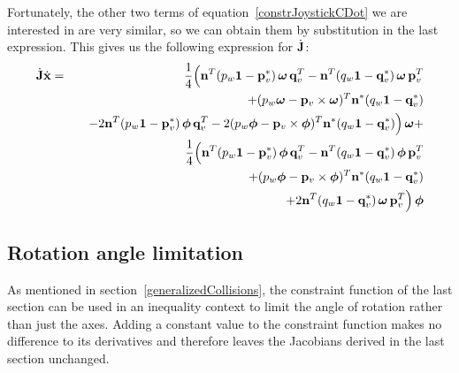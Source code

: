 Fortunately, the other two terms of equation~\ref{constrJoystickCDot} we are interested in are
very similar, so we can obtain them by substitution in the last expression. This gives us the
following expression for $\dot{\m{J}}$:
\begin{eqnarray}
\dot{\m{J}}\dot{\ve{x}} &=&
    \frac{1}{4}\Big( \ve{n}^T (p_w\m{1} - \dual{\ve{p}_v})\, \ve{\omega}\,\ve{q}_v^T
    -\ve{n}^T (q_w\m{1} - \dual{\ve{q}_v})\, \ve{\omega}\,\ve{p}_v^T \nonumber\\*&&\quad
    +(p_w\ve{\omega} - \ve{p}_v\times\ve{\omega})^T \dual{\ve{n}} (q_w\m{1} - \dual{\ve{q}_v})
    \nonumber\\*&&\quad
    -2\ve{n}^T (p_w\m{1} - \dual{\ve{p}_v})\, \ve{\phi}\,\ve{q}_v^T
    -2(p_w\ve{\phi} - \ve{p}_v\times\ve{\phi})^T \dual{\ve{n}} (q_w\m{1} - \dual{\ve{q}_v})
    \Big)\, \ve{\omega} + \nonumber\\*&&
    \frac{1}{4}\Big( \ve{n}^T (p_w\m{1} - \dual{\ve{p}_v})\, \ve{\phi}\,\ve{q}_v^T
    -\ve{n}^T (q_w\m{1} - \dual{\ve{q}_v})\, \ve{\phi}\,\ve{p}_v^T \nonumber\\*&&\quad
    +(p_w\ve{\phi} - \ve{p}_v\times\ve{\phi})^T \dual{\ve{n}} (q_w\m{1} - \dual{\ve{q}_v})
    \nonumber\\*&&\quad
    +2\ve{n}^T (q_w\m{1} - \dual{\ve{q}_v})\, \ve{\omega}\,\ve{p}_v^T \Big)\,\ve{\phi}
\end{eqnarray}


\subsection{Rotation angle limitation}

As mentioned in section~\ref{generalizedCollisions}, the constraint function of the last section
can be used in an inequality context to limit the angle of rotation rather than just the axes.
Adding a constant value to the constraint function makes no difference to its derivatives and
therefore leaves the Jacobians derived in the last section unchanged.

